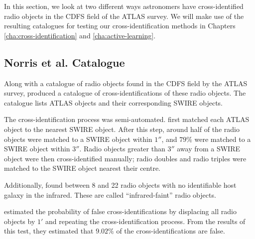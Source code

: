         In this section, we look at two different ways astronomers have
        cross-identified radio objects in the CDFS field of the ATLAS survey. We
        will make use of the resulting catalogues for testing our
        cross-identification methods in Chapters \ref{cha:cross-identification}
        and \ref{cha:active-learning}.


        \subsection{Norris et al. Catalogue}
        \label{sec:norris}

            Along with a catalogue of radio objects found in the CDFS field by
            the ATLAS survey, \citet{norris06} produced a catalogue of
            cross-identifications of these radio objects. The catalogue lists
            ATLAS objects and their corresponding SWIRE objects.

            The cross-identification process was semi-automated.
            \citeauthor{norris06} first matched each ATLAS object to the nearest
            SWIRE object. After this step, around half of the radio objects were
            matched to a SWIRE object within $1''$, and $79\%$ were matched to a
            SWIRE object within $3''$. Radio objects greater than $3''$ away
            from a SWIRE object were then cross-identified manually; radio
            doubles and radio triples were matched to the SWIRE object nearest
            their centre.

            Additionally, \citeauthor{norris06} found between 8 and 22 radio
            objects with no identifiable host galaxy in the infrared. These are
            called ``infrared-faint'' radio objects.

            \citeauthor{norris06} estimated the probability of false
            cross-identifications by displacing all radio objects by $1'$ and
            repeating the cross-identification process. From the results of this
            test, they estimated that $9.02\%$ of the cross-identifications are
            false.

